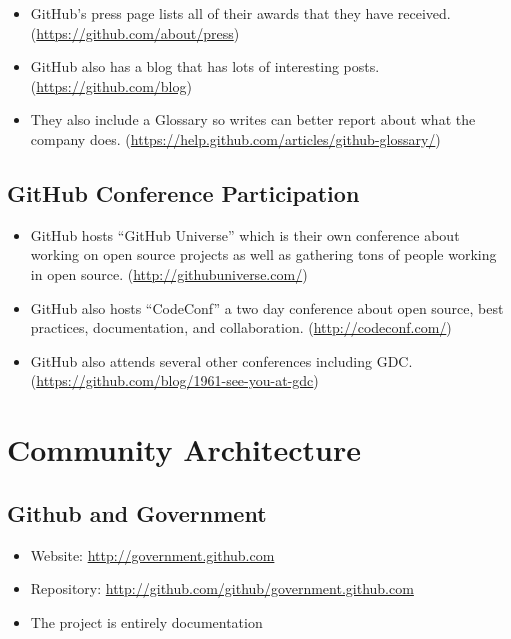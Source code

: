 \begin{itemize}
\itemsep1pt\parskip0pt
\item
  GitHub's press page lists all of their awards that they have received.
  (\url{https://github.com/about/press})
\item
  GitHub also has a blog that has lots of interesting posts.
  (\url{https://github.com/blog})
\item
  They also include a Glossary so writes can better report about what
  the company does.
  (\url{https://help.github.com/articles/github-glossary/})
\end{itemize}

\subsection{GitHub Conference
Participation}\label{github-conference-participation}

\begin{itemize}
\itemsep1pt\parskip0pt
\item
  GitHub hosts ``GitHub Universe'' which is their own conference about
  working on open source projects as well as gathering tons of people
  working in open source. (\url{http://githubuniverse.com/})
\item
  GitHub also hosts ``CodeConf'' a two day conference about open source,
  best practices, documentation, and collaboration.
  (\url{http://codeconf.com/})
\item
  GitHub also attends several other conferences including GDC.
  (\url{https://github.com/blog/1961-see-you-at-gdc})
\end{itemize}

\section{Community Architecture}\label{community-architecture}

\subsection{Github and Government}\label{github-and-government}

\begin{itemize}
\itemsep1pt\parskip0pt
\item
  Website: \url{http://government.github.com}
\item
  Repository: \url{http://github.com/github/government.github.com}
\item
  The project is entirely documentation
\end{itemize}

